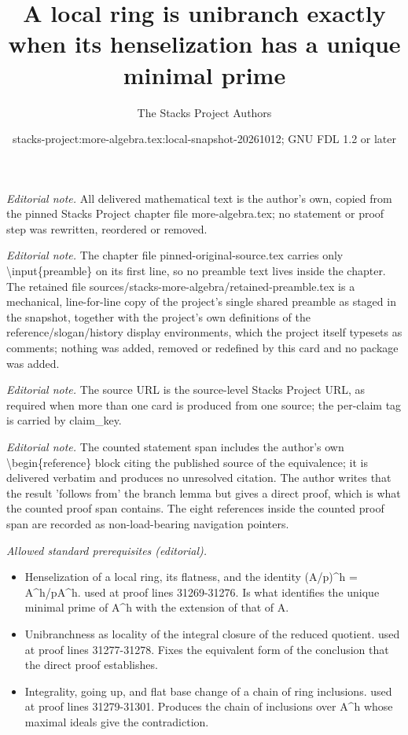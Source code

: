 \documentclass[10pt,a4paper]{amsart}
\title{A local ring is unibranch exactly when its henselization has a unique minimal prime}
\author{The Stacks Project Authors}
\date{stacks-project:more-algebra.tex:local-snapshot-20261012; GNU FDL 1.2 or later}
\theoremstyle{plain}
\theoremstyle{definition}
\theoremstyle{remark}
\numberwithin{equation}{subsection}
\begin{document}
\maketitle
\setcounter{subsection}{1}
\noindent\textit{Editorial note.} All delivered mathematical text is the author's own, copied from the pinned Stacks Project chapter file more-algebra.tex; no statement or proof step was rewritten, reordered or removed.\par\medskip
\noindent\textit{Editorial note.} The chapter file pinned-original-source.tex carries only \textbackslash{}input\{preamble\} on its first line, so no preamble text lives inside the chapter. The retained file sources/stacks-more-algebra/retained-preamble.tex is a mechanical, line-for-line copy of the project's single shared preamble as staged in the snapshot, together with the project's own definitions of the reference/slogan/history display environments, which the project itself typesets as comments; nothing was added, removed or redefined by this card and no package was added.\par\medskip
\noindent\textit{Editorial note.} The source URL is the source-level Stacks Project URL, as required when more than one card is produced from one source; the per-claim tag is carried by claim\_key.\par\medskip
\noindent\textit{Editorial note.} The counted statement span includes the author's own \textbackslash{}begin\{reference\} block citing the published source of the equivalence; it is delivered verbatim and produces no unresolved citation. The author writes that the result 'follows from' the branch lemma but gives a direct proof, which is what the counted proof span contains. The eight references inside the counted proof span are recorded as non-load-bearing navigation pointers.\par\medskip
\noindent\textit{Allowed standard prerequisites (editorial).}\begin{itemize}
\item Henselization of a local ring, its flatness, and the identity (A/p)\textasciicircum{}h = A\textasciicircum{}h/pA\textasciicircum{}h. used at proof lines 31269-31276. Is what identifies the unique minimal prime of A\textasciicircum{}h with the extension of that of A.
\item Unibranchness as locality of the integral closure of the reduced quotient. used at proof lines 31277-31278. Fixes the equivalent form of the conclusion that the direct proof establishes.
\item Integrality, going up, and flat base change of a chain of ring inclusions. used at proof lines 31279-31301. Produces the chain of inclusions over A\textasciicircum{}h whose maximal ideals give the contradiction.
\end{itemize}\medskip
\end{document}

